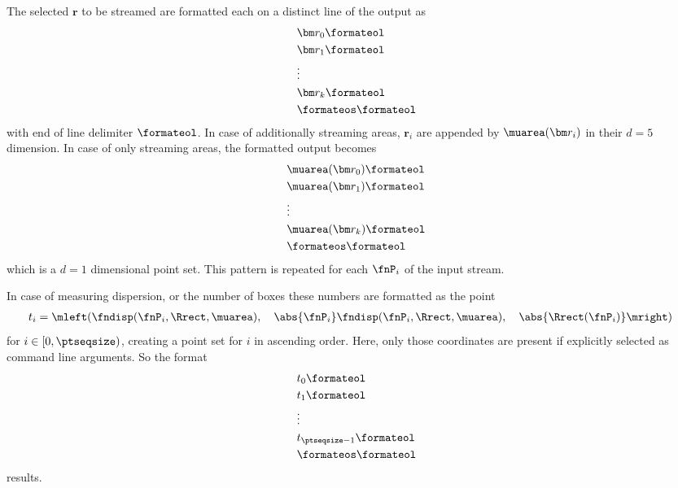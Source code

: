 The selected $\bm r$ to be streamed are formatted each on a distinct line of the output as
\begin{align*}
  &\bm r_0\formateol \\
  &\bm r_1\formateol \\
  &\vdots \\
  &\bm r_k\formateol \\
  &\formateos\formateol
\end{align*}
with end of line delimiter $\formateol$. In case of additionally streaming areas, $\bm r_i$ are appended by $\muarea(\bm r_i)$ in their $d=5$ dimension. In case of only streaming areas, the formatted output becomes
\begin{align*}
  &\muarea(\bm r_0)\formateol \\
  &\muarea(\bm r_1)\formateol \\
  &\vdots \\
  &\muarea(\bm r_k)\formateol \\
  &\formateos\formateol
\end{align*}
which is a $d=1$ dimensional point set. This pattern is repeated for each $\fnP_i$ of the input stream.

In case of measuring dispersion, or the number of boxes these numbers are formatted as the point
\begin{align*}
  t_i &= \mleft( \fndisp(\fnP_i, \Rrect, \muarea),\quad \abs{\fnP_i} \fndisp(\fnP_i, \Rrect, \muarea),\quad \abs{\Rrect(\fnP_i)} \mright)
\end{align*}
for $i \in [0,\ptseqsize)$, creating a point set for $i$ in ascending order. Here, only those coordinates are present if explicitly selected as command line arguments. So the format
\begin{align*}
  &t_0\formateol\\
  &t_1\formateol\\
  &\vdots \\
  &t_{\ptseqsize-1}\formateol\\
  &\formateos\formateol
\end{align*}
results.


